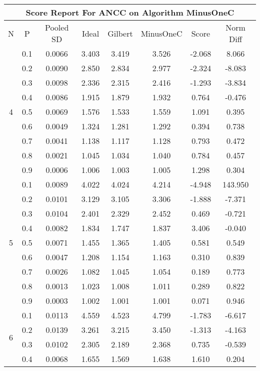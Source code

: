 \documentclass[11pt,a4paper]{report}
\begin{document}
\begin{longtable}{ | c | c || c | c | c | c | c | c | }
\hline
\multicolumn{8}{|c|}{ Score Report For ANCC on Algorithm MinusOneC} \\
\hline
N & P & Pooled SD &  Ideal &  Gilbert & MinusOneC  & Score & Norm Diff \\
 \hline
 \hline
 \endhead
\multirow{9}{*}{4} & 0.1 & 0.0066 & 3.403 & 3.419 & 3.526 & -2.068 & 8.066 \\
 & 0.2 & 0.0090 & 2.850 & 2.834 & 2.977 & -2.324 & -8.083 \\
 & 0.3 & 0.0098 & 2.336 & 2.315 & 2.416 & -1.293 & -3.834 \\
 & 0.4 & 0.0086 & 1.915 & 1.879 & 1.932 & 0.764 & -0.476 \\
 & 0.5 & 0.0069 & 1.576 & 1.533 & 1.559 & 1.091 & 0.395 \\
 & 0.6 & 0.0049 & 1.324 & 1.281 & 1.292 & 0.394 & 0.738 \\
 & 0.7 & 0.0041 & 1.138 & 1.117 & 1.128 & 0.793 & 0.472 \\
 & 0.8 & 0.0021 & 1.045 & 1.034 & 1.040 & 0.784 & 0.457 \\
 & 0.9 & 0.0006 & 1.006 & 1.003 & 1.005 & 1.298 & 0.304 \\
 \hline
\multirow{9}{*}{5} & 0.1 & 0.0089 & 4.022 & 4.024 & 4.214 & -4.948 & 143.950 \\
 & 0.2 & 0.0101 & 3.129 & 3.105 & 3.306 & -1.888 & -7.371 \\
 & 0.3 & 0.0104 & 2.401 & 2.329 & 2.452 & 0.469 & -0.721 \\
 & 0.4 & 0.0082 & 1.834 & 1.747 & 1.837 & 3.406 & -0.040 \\
 & 0.5 & 0.0071 & 1.455 & 1.365 & 1.405 & 0.581 & 0.549 \\
 & 0.6 & 0.0047 & 1.208 & 1.154 & 1.163 & 0.310 & 0.839 \\
 & 0.7 & 0.0026 & 1.082 & 1.045 & 1.054 & 0.189 & 0.773 \\
 & 0.8 & 0.0013 & 1.023 & 1.008 & 1.011 & 0.289 & 0.822 \\
 & 0.9 & 0.0003 & 1.002 & 1.001 & 1.001 & 0.071 & 0.946 \\
 \hline
\multirow{9}{*}{6} & 0.1 & 0.0113 & 4.559 & 4.523 & 4.799 & -1.783 & -6.617 \\
 & 0.2 & 0.0139 & 3.261 & 3.215 & 3.450 & -1.313 & -4.163 \\
 & 0.3 & 0.0102 & 2.305 & 2.189 & 2.368 & 0.735 & -0.539 \\
 & 0.4 & 0.0068 & 1.655 & 1.569 & 1.638 & 1.610 & 0.204 \\

\end{longtable}
\end{document}
